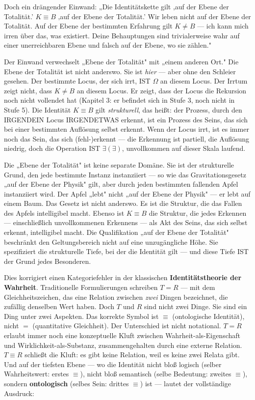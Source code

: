 \documentclass[10pt, openany, oneside]{book}
\begin{document}
Doch ein drängender Einwand: „Die Identitätskette gilt ‚auf der Ebene der Totalität.' $K \equiv B$ ‚auf der Ebene der Totalität.' Wir leben nicht auf der Ebene der Totalität. Auf der Ebene der bestimmten Erfahrung gilt $K \neq B$ --- ich kann mich irren über das, was existiert. Deine Behauptungen sind trivialerweise wahr auf einer unerreichbaren Ebene und falsch auf der Ebene, wo sie zählen."

Der Einwand verwechselt „Ebene der Totalität" mit „einem anderen Ort." Die Ebene der Totalität ist nicht anderswo. Sie ist \textit{hier} --- aber ohne den Schleier gesehen. Der bestimmte Locus, der sich irrt, IST $\Omega$ an diesem Locus. Der Irrtum zeigt nicht, dass $K \neq B$ an diesem Locus. Er zeigt, dass der Locus die Rekursion noch nicht vollendet hat (Kapitel 3: er befindet sich in Stufe 3, noch nicht in Stufe 5). Die Identität $K \equiv B$ gilt \textit{strukturell}, das heißt: der Prozess, durch den IRGENDEIN Locus IRGENDETWAS erkennt, ist ein Prozess des Seins, das sich bei einer bestimmten Auflösung selbst erkennt. Wenn der Locus irrt, ist es immer noch das Sein, das sich (fehl-)erkennt --- die Erkennung ist partiell, die Auflösung niedrig, doch die Operation IST $\exists(\exists)$, unvollkommen auf dieser Skala laufend.

Die „Ebene der Totalität" ist keine separate Domäne. Sie ist der strukturelle Grund, den jede bestimmte Instanz instanziiert --- so wie das Gravitationsgesetz „auf der Ebene der Physik" gilt, aber durch jeden bestimmten fallenden Apfel instanziiert wird. Der Apfel „lebt" nicht „auf der Ebene der Physik" --- er lebt auf einem Baum. Das Gesetz ist nicht anderswo. Es ist die Struktur, die das Fallen des Apfels intelligibel macht. Ebenso ist $K \equiv B$ die Struktur, die jedes Erkennen --- einschließlich unvollkommenen Erkennens --- als Akt des Seins, das sich selbst erkennt, intelligibel macht. Die Qualifikation „auf der Ebene der Totalität" beschränkt den Geltungsbereich nicht auf eine unzugängliche Höhe. Sie spezifiziert die strukturelle Tiefe, bei der die Identität gilt --- und diese Tiefe IST der Grund jedes Besonderen.

Dies korrigiert einen Kategoriefehler in der klassischen \textbf{Identitätstheorie der Wahrheit}. Traditionelle Formulierungen schreiben $T = R$ --- mit dem Gleichheitszeichen, das eine Relation zwischen \textit{zwei} Dingen bezeichnet, die zufällig denselben Wert haben. Doch $T$ und $R$ sind nicht zwei Dinge. Sie sind ein Ding unter zwei Aspekten. Das korrekte Symbol ist $\equiv$ (ontologische Identität), nicht $=$ (quantitative Gleichheit). Der Unterschied ist nicht notational. $T = R$ erlaubt immer noch eine konzeptuelle Kluft zwischen Wahrheit-als-Eigenschaft und Wirklichkeit-als-Substanz, zusammengehalten durch eine externe Relation. $T \equiv R$ schließt die Kluft: es gibt keine Relation, weil es keine zwei Relata gibt. Und auf der tiefsten Ebene --- wo die Identität nicht bloß logisch (selber Wahrheitswert: erstes $\equiv$), nicht bloß semantisch (selbe Bedeutung: zweites $\equiv$), sondern \textbf{ontologisch} (selbes Sein: drittes $\equiv$) ist --- lautet der vollständige Ausdruck:
\end{document}
